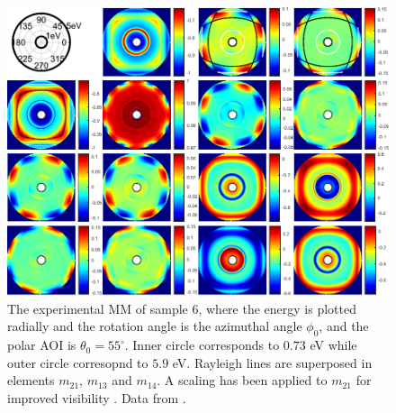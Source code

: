 \begin{figure}[h!]
    \centering
    \includegraphics[width=\linewidth]{figures/ch4/S6/exp/Muller_rot_S6_55.pdf}
    \caption{The experimental MM of sample 6, where the energy is plotted radially and the rotation angle is the azimuthal angle $\phi_0$, and the polar AOI is $\theta_0=55^\circ$. Inner circle corresponds to $0.73$ eV while outer circle corresopnd to $5.9$ eV. Rayleigh lines are superposed in elements $m_{21}$, $m_{13}$ and $m_{14}$. A scaling has been applied to $m_{21}$ for improved visibility . Data from \cite{brakstad_thesis}.}
    \label{fig:S6_contour_MM_exp}
\end{figure}
